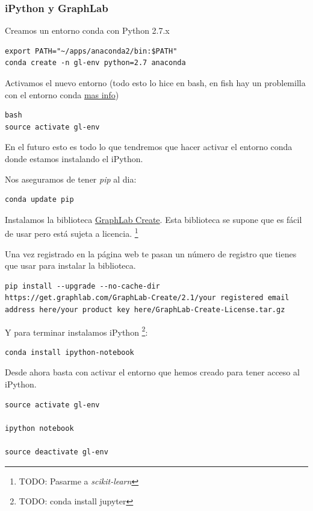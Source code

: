 \documentclass[12pt,spanish,]{scrartcl}
\begin{document}
\subsubsection{iPython y GraphLab}\label{ipython-y-graphlab}

Creamos un entorno conda con Python 2.7.x

\begin{verbatim}
export PATH="~/apps/anaconda2/bin:$PATH"
conda create -n gl-env python=2.7 anaconda
\end{verbatim}

Activamos el nuevo entorno (todo esto lo hice en bash, en fish hay un
problemilla con el entorno conda
\href{https://penandpants.com/2014/02/28/using-conda-environments-and-the-fish-shell/}{mas
info})

\begin{verbatim}
bash
source activate gl-env
\end{verbatim}

En el futuro esto es todo lo que tendremos que hacer activar el entorno
conda donde estamos instalando el iPython.

Nos aseguramos de tener \emph{pip} al dia:

\begin{verbatim}
conda update pip
\end{verbatim}

Instalamos la biblioteca
\href{https://turi.com/products/create/}{GraphLab Create}. Esta
biblioteca se supone que es fácil de usar pero está sujeta a licencia.
\footnote{TODO: Pasarme a \emph{scikit-learn}}

Una vez registrado en la página web te pasan un número de registro que
tienes que usar para instalar la biblioteca.

\begin{verbatim}
pip install --upgrade --no-cache-dir https://get.graphlab.com/GraphLab-Create/2.1/your registered email address here/your product key here/GraphLab-Create-License.tar.gz
\end{verbatim}

Y para terminar instalamos iPython \footnote{TODO: conda install jupyter}:

\begin{verbatim}
conda install ipython-notebook
\end{verbatim}

Desde ahora basta con activar el entorno que hemos creado para tener
acceso al iPython.

\begin{verbatim}
source activate gl-env

ipython notebook

source deactivate gl-env
\end{verbatim}
\end{document}
